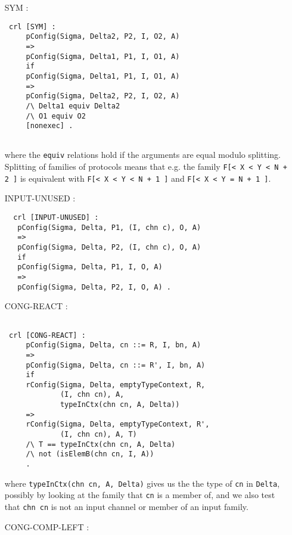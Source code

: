 \documentclass{article}
\begin{document}
\begin{itemize}
\item[SYM]:
 \begin{lstlisting}
 crl [SYM] :
     pConfig(Sigma, Delta2, P2, I, O2, A) 
     => 
     pConfig(Sigma, Delta1, P1, I, O1, A)
     if
     pConfig(Sigma, Delta1, P1, I, O1, A)
     => 
     pConfig(Sigma, Delta2, P2, I, O2, A) 
     /\ Delta1 equiv Delta2 
     /\ O1 equiv O2     
     [nonexec] .
     
  \end{lstlisting}
  \noindent where the \texttt{equiv} relations hold if the arguments
  are equal modulo splitting. Splitting of families of protocols means
  that e.g. the family
  \texttt{F[< X < Y < N + 2 ]}
  is equivalent with
   \texttt{F[< X < Y < N + 1 ]}
   and 
    \texttt{F[< X < Y = N + 1 ]}. 
  
\item[INPUT-UNUSED] :
 \begin{lstlisting}
  crl [INPUT-UNUSED] :
   pConfig(Sigma, Delta, P1, (I, chn c), O, A)
   =>
   pConfig(Sigma, Delta, P2, (I, chn c), O, A)
   if
   pConfig(Sigma, Delta, P1, I, O, A)
   =>
   pConfig(Sigma, Delta, P2, I, O, A) .
 \end{lstlisting}  
  
\item[CONG-REACT]:
\begin{lstlisting}    
     
 crl [CONG-REACT] : 
     pConfig(Sigma, Delta, cn ::= R, I, bn, A) 
     =>
     pConfig(Sigma, Delta, cn ::= R', I, bn, A)
     if
     rConfig(Sigma, Delta, emptyTypeContext, R, 
             (I, chn cn), A, 
             typeInCtx(chn cn, A, Delta))
     =>
     rConfig(Sigma, Delta, emptyTypeContext, R', 
             (I, chn cn), A, T) 
     /\ T == typeInCtx(chn cn, A, Delta)
     /\ not (isElemB(chn cn, I, A))
     .
  \end{lstlisting} 
  \noindent where \texttt{typeInCtx(chn cn, A, Delta)} gives us the 
  the type of \texttt{cn} in \texttt{Delta}, possibly by looking at the 
  family that \texttt{cn} is a member of, and
  we also test that \texttt{chn cn} is not an input channel or member of
  an input family.
\item[CONG-COMP-LEFT]:
\begin{lstlisting}    


\end{lstlisting}
\end{itemize}
\end{document}

